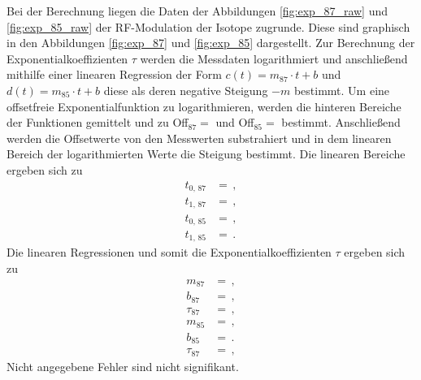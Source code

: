 Bei der Berechnung liegen die Daten der Abbildungen \ref{fig:exp_87_raw} und \ref{fig:exp_85_raw} der RF-Modulation der Isotope zugrunde.
Diese sind graphisch in den Abbildungen \ref{fig:exp_87} und \ref{fig:exp_85} dargestellt.
Zur Berechnung der Exponentialkoeffizienten $\tau$ werden die Messdaten logarithmiert und anschließend mithilfe einer linearen Regression der Form $c(t)=m_\text{87} \cdot t + b$ und $d(t)=m_\text{85} \cdot t + b$ diese als deren negative Steigung $-m$ bestimmt.
Um eine offsetfreie Exponentialfunktion zu logarithmieren, werden die hinteren Bereiche der Funktionen gemittelt und zu Off$_\text{87} = $ und Off$_\text{85} = $ bestimmt.
Anschließend werden die Offsetwerte von den Messwerten substrahiert und in dem linearen Bereich der logarithmierten Werte die Steigung bestimmt.
Die linearen Bereiche ergeben sich zu
\begin{align*}
    t_\text{0, 87} &=  \,,\\
    t_\text{1, 87} &=  \,,\\
    t_\text{0, 85} &=  \,,\\
    t_\text{1, 85} &=  \,.
\end{align*}
Die linearen Regressionen und somit die Exponentialkoeffizienten $\tau$ ergeben sich zu
\begin{align*}
    m_\text{87} &=  \,,\\
    b_\text{87} &=  \,,\\
    \tau_\text{87} &=  \,,\\
    m_\text{85} &=  \,,\\
    b_\text{85} &=  \,.\\
    \tau_\text{87} &=  \,,
\end{align*}
Nicht angegebene Fehler sind nicht signifikant.

